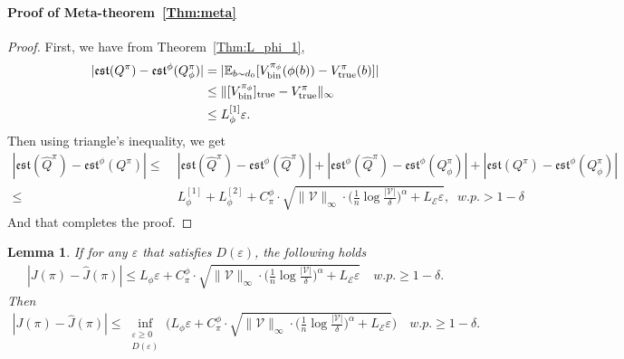 \documentclass[twoside]{article}
\newtheorem{lemma}{Lemma}
\newcommand{\CAL}[1]{\mathcal{#1}}
\begin{document}
\paragraph{Proof of Meta-theorem~\ref{Thm:meta}}
\begin{proof}
First, we have from Theorem~\ref{Thm:L_phi_1},
\begin{align*}
    |\mathfrak{est}(Q^\pi)-\mathfrak{est}^\phi(Q_\phi^\pi)|=&\;|\mathbb{E}_{b\sim d_0}[V^{\pi_\phi}_{\rm bin}(\phi(b))-V^\pi_{\rm true}(b)]|\nonumber\\
        \leq&\;\|[V^{\pi_\phi}_{\rm bin}]_{\rm true}-V^\pi_{\rm true}\|_\infty\\
        \leq&\;L_\phi^{[1]}\varepsilon.
\end{align*}
Then using triangle's inequality, we get
\begin{align*}
    |\mathfrak{est}(\hat{Q}^\pi)-\mathfrak{est}^\phi(Q^\pi)|\leq&\; |\mathfrak{est}(\hat{Q}^\pi)-\mathfrak{est}^\phi(\hat{Q}^\pi)|+|\mathfrak{est}^\phi(\hat{Q}^\pi)-\mathfrak{est}^\phi(Q_\phi^\pi)|+|\mathfrak{est}(Q^\pi)-\mathfrak{est}^\phi(Q_\phi^\pi)|\\
    \leq&\; L_\phi^{[1]}+L_\phi^{[2]}+C_\pi^\phi\cdot\sqrt{\|\CAL{V}\|_\infty\cdot\bigg(\frac{1}{n}\log\frac{|\CAL{V}|}{\delta}\bigg)^\alpha+L_{\CAL{E}}\varepsilon},\;\; w.p.>1-\delta
\end{align*}
And that completes the proof.
\end{proof}
\begin{lemma}\label{lemma:meta}
    If for any $\varepsilon$ that satisfies $D(\varepsilon)$, the following holds
    \begin{align}
        |J(\pi)-\hat{J}(\pi)|\leq L_\phi\varepsilon+ C_\pi^\phi\cdot \sqrt{\|\CAL{V}\|_\infty\cdot\bigg(\frac{1}{n}\log\frac{|\CAL{V}|}{\delta}\bigg)^\alpha+L_\CAL{E}\varepsilon}\quad w.p. \geq 1-\delta.
    \end{align}
    Then
    \begin{align}
        |J(\pi)-\hat{J}(\pi)|\leq \inf_{\substack{\varepsilon\geq 0\\D(\varepsilon)}}\Bigg(L_\phi\varepsilon+ C_\pi^\phi\cdot \sqrt{\|\CAL{V}\|_\infty\cdot\bigg(\frac{1}{n}\log\frac{|\CAL{V}|}{\delta}\bigg)^\alpha+L_\CAL{E}\varepsilon}\Bigg)\quad w.p. \geq 1-\delta.
    \end{align}
\end{lemma}
\end{document}
